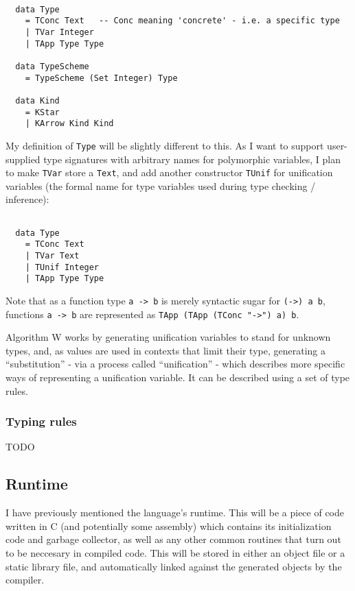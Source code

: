 \documentclass[9pt]{extarticle}
\begin{document}
\begin{verbatim}

  data Type
    = TConc Text   -- Conc meaning 'concrete' - i.e. a specific type
    | TVar Integer
    | TApp Type Type

  data TypeScheme
    = TypeScheme (Set Integer) Type

  data Kind
    = KStar
    | KArrow Kind Kind

\end{verbatim}

My definition of \verb'Type' will be slightly different to this. As I
want to support user-supplied type signatures with arbitrary names for
polymorphic variables, I plan to make \verb'TVar' store a \verb'Text',
and add another constructor \verb'TUnif' for unification variables (the
formal name for type variables used during type checking / inference):

\begin{verbatim}

  data Type
    = TConc Text
    | TVar Text
    | TUnif Integer
    | TApp Type Type

\end{verbatim}

Note that as a function type \verb'a -> b' is merely syntactic sugar for
\verb'(->) a b', functions \verb'a -> b' are represented as
\verb'TApp (TApp (TConc "->") a) b'.

Algorithm W works by generating unification variables to stand for
unknown types, and, as values are used in contexts that limit their
type, generating a ``substitution'' - via a process called
``unification'' - which describes more specific ways of representing a
unification variable. It can be described using a set of type rules.

\subsubsection{Typing rules}

TODO

\subsection{Runtime}

I have previously mentioned the language's runtime. This will be a piece
of code written in C (and potentially some assembly) which contains its
initialization code and garbage collector, as well as any other common
routines that turn out to be neccesary in compiled code. This will be
stored in either an object file or a static library file, and
automatically linked against the generated objects by the compiler.
\end{document}
